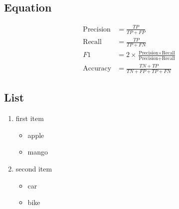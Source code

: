 \documentclass{artisubssubssubssubssubscle}
\begin{document}
\subsection{Equation}
\begin{align}
    \text{Precision} &= \frac{TP}{TP + FP} \tag{1}\\
    \text{Recall} &= \frac{TP}{TP + FN} \tag{2}\\
    F1 &= 2 \times \frac{\text{Precision} \times \text{Recall}}{\text{Precision} + \text{Recall}} \tag{3}\\
    \text{Accuracy} &= \frac{TN + TP}{TN + FP + TP + FN} \tag{4}
\end{align}

\subsection{List}
\begin{enumerate}
    \item first item
    \begin{itemize}
        \item apple
        \item mango
    \end{itemize}
    \item second item
    \begin{itemize}
        \item car
        \item bike
    \end{itemize}
\end{enumerate}
\end{document}
